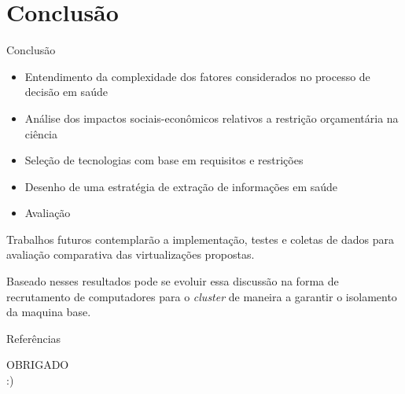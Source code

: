 \documentclass[10pt,brazil]{beamer}
\theoremstyle{definition}
\begin{document}
\section{Conclusão}

\begin{frame}{Conclusão}
  \begin{itemize}
    \item Entendimento da complexidade dos fatores considerados no processo de decisão em saúde
    \item Análise dos impactos sociais-econômicos relativos a restrição orçamentária na ciência
    \item Seleção de tecnologias com base em requisitos e restrições
    \item Desenho de uma estratégia de extração de informações em saúde
    \item Avaliação 
  \end{itemize}
  Trabalhos futuros contemplarão a implementação, testes e coletas de dados para avaliação comparativa das virtualizações propostas. 
  
  Baseado nesses resultados pode se evoluir essa discussão na forma de recrutamento de computadores para o \emph{cluster} de maneira a garantir o isolamento da maquina base.
\end{frame}


\begin{frame}[allowframebreaks]{Referências}
  \small
  
\end{frame}


\begin{frame}
  \centering
  {\color{ros} OBRIGADO\\
    :)}
\end{frame}
\end{document}
